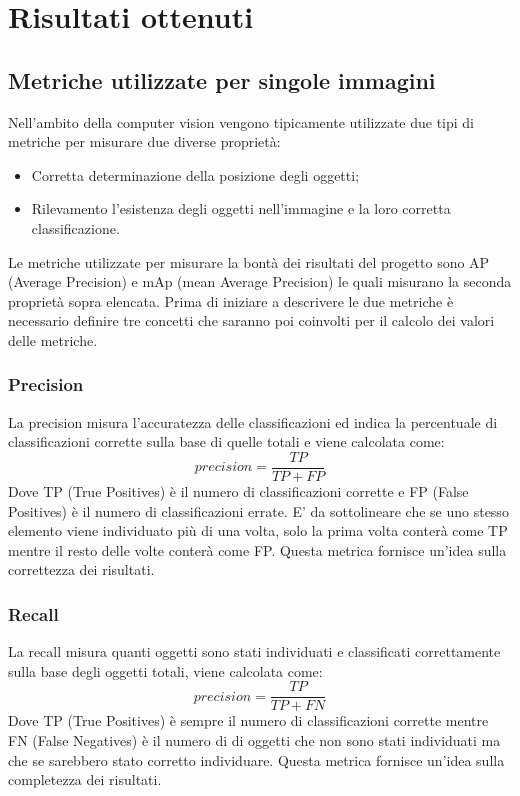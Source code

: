 \section{Risultati ottenuti}
\subsection{Metriche utilizzate per singole immagini}
Nell'ambito della computer vision vengono tipicamente utilizzate due tipi di metriche per misurare due diverse proprietà:
\begin{itemize}
\item Corretta determinazione della posizione degli oggetti;
\item Rilevamento l'esistenza degli oggetti nell'immagine e la loro corretta classificazione.
\end{itemize}
Le metriche utilizzate per misurare la bontà dei risultati del progetto sono AP (Average Precision) e mAp (mean Average Precision) le quali misurano la seconda proprietà sopra elencata.
Prima di iniziare a descrivere le due metriche è necessario definire tre concetti che saranno poi coinvolti per il calcolo dei valori delle metriche.
\subsubsection{Precision}
La precision misura l'accuratezza delle classificazioni ed indica la percentuale di classificazioni corrette sulla base di quelle totali e viene calcolata come:
\[
    precision = \frac{TP}{TP + FP}
\]
Dove TP (True Positives) è il numero di classificazioni corrette e FP (False Positives) è il numero di classificazioni errate. E' da sottolineare che se uno stesso elemento viene individuato più di una volta, solo la prima volta conterà come TP mentre il resto delle volte conterà come FP. Questa metrica fornisce un'idea sulla correttezza dei risultati.
\subsubsection{Recall}
La recall misura quanti oggetti sono stati individuati e classificati correttamente sulla base degli oggetti totali, viene calcolata come:
\[
    precision = \frac{TP}{TP + FN}
\]
Dove TP (True Positives) è sempre il numero di classificazioni corrette mentre FN (False Negatives) è il numero di di oggetti che non sono stati individuati ma che se sarebbero stato corretto individuare. Questa metrica fornisce un'idea sulla completezza dei risultati.
